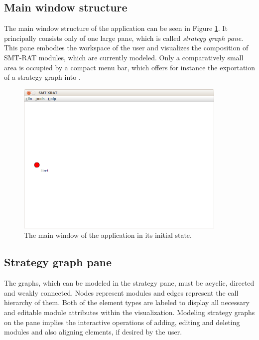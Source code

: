 \subsection{Main window structure}
\label{sec:main_window_structure_of_smt-xrat}
The main window structure of the \smtxrat application can be seen 
in Figure \ref{fig:smt-xrat_main_window}. It principally consists 
only of one large pane, which is called \emph{strategy graph pane}. 
This pane embodies the workspace of the user and visualizes the 
composition of SMT-RAT modules, which are currently modeled. Only a
comparatively small area is occupied by a compact menu bar, which 
offers for instance the exportation of a strategy graph into \smtrat.
\begin{figure}
  \begin{center}
    \includegraphics[width=0.9\textwidth]{graphics/smt-xrat_main_window.png}
  \end{center}
  \caption{The main window of the \smtxrat application in its initial state.}
  \label{fig:smt-xrat_main_window}
\end{figure}

\subsection{Strategy graph pane}
\label{sec:the_strategy_graph_pane}
The graphs, which can be modeled in the strategy pane, must be acyclic, directed and weakly 
connected. Nodes represent \smtrat modules and edges represent the call 
hierarchy of them. Both of the element types are labeled to display all 
necessary and editable module attributes within the visualization.
Modeling strategy graphs on the pane implies the interactive operations 
of adding, editing and deleting modules and also aligning elements, 
if desired by the user.

